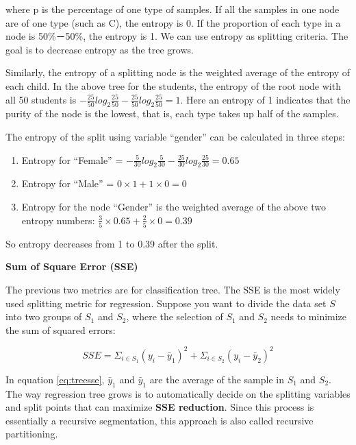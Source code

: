 \documentclass[12pt,]{krantz}
\providecommand{\tightlist}{%
  \setlength{\itemsep}{0pt}\setlength{\parskip}{0pt}}
\begin{document}
where p is the percentage of one type of samples. If all the samples in one node are of one type (such as C), the entropy is 0. If the proportion of each type in a node is 50\%－50\%, the entropy is 1. We can use entropy as splitting criteria. The goal is to decrease entropy as the tree grows.

Similarly, the entropy of a splitting node is the weighted average of the entropy of each child. In the above tree for the students, the entropy of the root node with all 50 students is \(-\frac{25}{50}log_{2}\frac{25}{50}-\frac{25}{50}log_{2}\frac{25}{50}=1\). Here an entropy of 1 indicates that the purity of the node is the lowest, that is, each type takes up half of the samples.

The entropy of the split using variable ``gender'' can be calculated in three steps:

\begin{enumerate}
\def\labelenumi{\arabic{enumi}.}
\tightlist
\item
  Entropy for ``Female'' = \(-\frac{5}{30}log_{2}\frac{5}{30}-\frac{25}{30}log_{2}\frac{25}{30}=0.65\)
\item
  Entropy for ``Male'' = \(0\times1+1\times 0=0\)
\item
  Entropy for the node ``Gender'' is the weighted average of the above two entropy numbers: \(\frac{3}{5}\times 0.65+\frac{2}{5}\times 0=0.39\)
\end{enumerate}

So entropy decreases from 1 to 0.39 after the split.

\textbf{Sum of Square Error (SSE)}

The previous two metrics are for classification tree. The SSE is the most widely used splitting metric for regression. Suppose you want to divide the data set \(S\) into two groups of \(S_{1}\) and \(S_{2}\), where the selection of \(S_{1}\) and \(S_{2}\) needs to minimize the sum of squared errors:

\begin{equation}
SSE=\Sigma_{i\in S_{1}}(y_{i}-\bar{y}_{1})^{2}+\Sigma_{i\in S_{2}}(y_{i}-\bar{y}_{2})^{2}
\label{eq:treesse}
\end{equation}

In equation \eqref{eq:treesse}, \(\bar{y}_{1}\) and \(\bar{y}_{1}\) are the average of the sample in \(S_{1}\) and \(S_{2}\). The way regression tree grows is to automatically decide on the splitting variables and split points that can maximize \textbf{SSE reduction}. Since this process is essentially a recursive segmentation, this approach is also called recursive partitioning.
\end{document}
